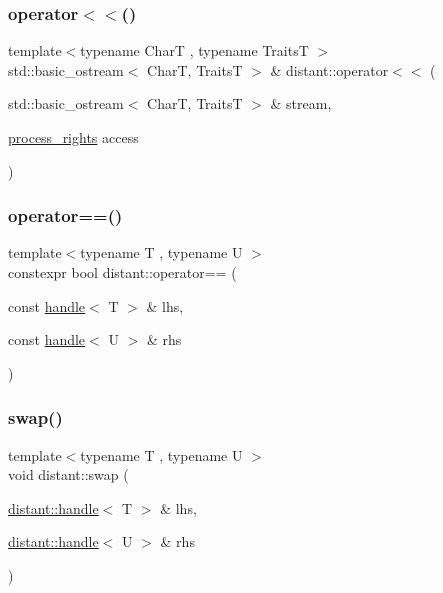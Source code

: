 \mbox{\label{namespacedistant_adc41c1da8271c21baad8dd69328f8066}} 
\subsubsection{\texorpdfstring{operator$<$$<$()}{operator<<()}}
{\footnotesize\ttfamily template$<$typename CharT , typename TraitsT $>$ \\
std\+::basic\+\_\+ostream$<$ CharT, TraitsT $>$ \& distant\+::operator$<$$<$ (\begin{DoxyParamCaption}\item[{std\+::basic\+\_\+ostream$<$ CharT, TraitsT $>$ \&}]{stream,  }\item[{\mbox{\hyperlink{structdistant_1_1access__rights_ae153052a690584111c46ec7a78d1ef81}{process\+\_\+rights}}}]{access }\end{DoxyParamCaption})}

\mbox{\label{namespacedistant_af50e6271bb4ffe13138b5352bf76aaa6}} 
\subsubsection{\texorpdfstring{operator==()}{operator==()}}
{\footnotesize\ttfamily template$<$typename T , typename U $>$ \\
constexpr bool distant\+::operator== (\begin{DoxyParamCaption}\item[{const \mbox{\hyperlink{classdistant_1_1handle}{handle}}$<$ T $>$ \&}]{lhs,  }\item[{const \mbox{\hyperlink{classdistant_1_1handle}{handle}}$<$ U $>$ \&}]{rhs }\end{DoxyParamCaption})\hspace{0.3cm}{\ttfamily [noexcept]}}

\mbox{\label{namespacedistant_aa07e5630aa553dd96069e86f8e64ad8c}} 
\subsubsection{\texorpdfstring{swap()}{swap()}}
{\footnotesize\ttfamily template$<$typename T , typename U $>$ \\
void distant\+::swap (\begin{DoxyParamCaption}\item[{\mbox{\hyperlink{classdistant_1_1handle}{distant\+::handle}}$<$ T $>$ \&}]{lhs,  }\item[{\mbox{\hyperlink{classdistant_1_1handle}{distant\+::handle}}$<$ U $>$ \&}]{rhs }\end{DoxyParamCaption})\hspace{0.3cm}{\ttfamily [noexcept]}}



